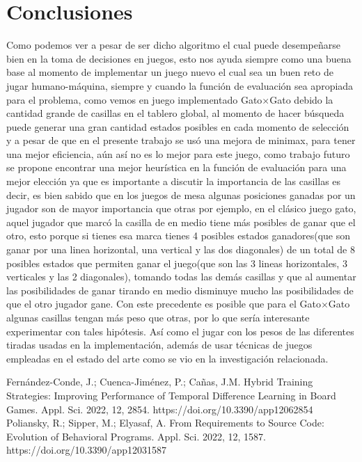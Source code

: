 \documentclass[runningheads]{llncs}
\begin{document}
\section{Conclusiones}
Como podemos ver a pesar de ser dicho algoritmo el cual puede desempeñarse bien en la toma de decisiones en juegos, esto nos ayuda siempre como una buena base al momento de implementar un juego nuevo el cual sea un buen reto de jugar humano-máquina, siempre y cuando la función de evaluación sea apropiada para el problema, como vemos en juego implementado Gato$\times$Gato debido la cantidad grande de casillas en el tablero global, al momento de hacer búsqueda puede generar una gran cantidad estados posibles en cada momento de selección y a pesar de que en el presente trabajo se usó una mejora de minimax, para tener una mejor eficiencia, aún así no es lo mejor para este juego, como trabajo futuro se propone encontrar una mejor heurística en la función de evaluación para una mejor elección ya que es importante a discutir la importancia de las casillas es decir, es bien sabido que en los juegos de mesa algunas posiciones ganadas por un jugador son de mayor importancia que otras por ejemplo, en el clásico juego gato, aquel jugador que marcó la casilla de en medio tiene más posibles de ganar que el otro, esto porque si tienes esa marca tienes 4 posibles estados ganadores(que son ganar por una linea horizontal, una vertical y las dos diagonales) de un total de 8 posibles estados que permiten ganar el juego(que son las 3 lineas horizontales, 3 verticales y las 2 diagonales), tomando todas las demás casillas y que al aumentar las posibilidades de ganar tirando en medio disminuye mucho las posibilidades de que el otro jugador gane. Con este precedente es posible que para el Gato$\times$Gato algunas casillas tengan más peso que otras, por lo que sería interesante experimentar con tales hipótesis. Así como el jugar con los pesos de las diferentes tiradas usadas en la implementación, además de usar técnicas de juegos empleadas en el estado del arte como se vio en la investigación relacionada.

%
%
% 
% 
%
\begin{thebibliography}{8}
Fernández-Conde, J.; Cuenca-Jiménez, P.; Cañas, J.M. Hybrid Training Strategies: Improving Performance of Temporal Difference Learning in Board Games. Appl. Sci. 2022, 12, 2854. https://doi.org/10.3390/app12062854
Poliansky, R.; Sipper, M.; Elyasaf, A. From Requirements to Source Code: Evolution of Behavioral Programs. Appl. Sci. 2022, 12, 1587. https://doi.org/10.3390/app12031587

\end{thebibliography}
\end{document}

